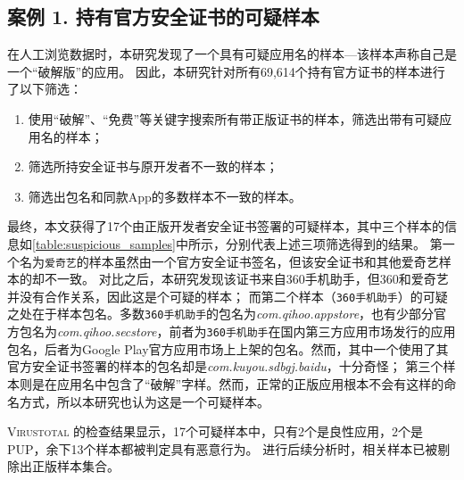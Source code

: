 \subsection{案例 1. 持有官方安全证书的可疑样本}

在人工浏览数据时，本研究发现了一个具有可疑应用名的样本---该样本声称自己是一个``破解版''的应用。
因此，本研究针对所有69,614个持有官方证书的样本进行了以下筛选：
\begin{enumerate}
    \item 使用``破解''、``免费''等关键字搜索所有带正版证书的样本，筛选出带有可疑应用名的样本；
    \item 筛选所持安全证书与原开发者不一致的样本；
    \item 筛选出包名和同款App的多数样本不一致的样本。
\end{enumerate}

最终，本文获得了17个由正版开发者安全证书签署的可疑样本，其中三个样本的信息如\autoref{table:suspicious_samples}中所示，分别代表上述三项筛选得到的结果。
第一个名为\texttt{爱奇艺}的样本虽然由一个官方安全证书签名，但该安全证书和其他爱奇艺样本的却不一致。
对比之后，本研究发现该证书来自360手机助手，但360和爱奇艺并没有合作关系，因此这是个可疑的样本；
而第二个样本（\texttt{360手机助手}）的可疑之处在于样本包名。多数\texttt{360手机助手}的包名为\emph{com.qihoo.appstore}，也有少部分官方包名为\emph{com.qihoo.secstore}，前者为\texttt{360手机助手}在国内第三方应用市场发行的应用包名，后者为Google Play官方应用市场上上架的包名。然而，其中一个使用了其官方安全证书签署的样本的包名却是\emph{com.kuyou.sdbgj.baidu}，十分奇怪；
第三个样本则是在应用名中包含了``破解''字样。然而，正常的正版应用根本不会有这样的命名方式，所以本研究也认为这是一个可疑样本。


\textsc{Virustotal} 的检查结果显示，17个可疑样本中，只有2个是良性应用，2个是PUP，余下13个样本都被判定具有恶意行为。
进行后续分析时，相关样本已被剔除出正版样本集合。

